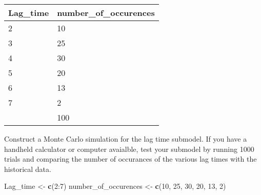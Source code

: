 \documentclass[]{article}
\newenvironment{Shaded}{\begin{snugshade}}{\end{snugshade}}
\newcommand{\KeywordTok}[1]{\textcolor[rgb]{0.13,0.29,0.53}{\textbf{{#1}}}}
\newcommand{\DecValTok}[1]{\textcolor[rgb]{0.00,0.00,0.81}{{#1}}}
\newcommand{\StringTok}[1]{\textcolor[rgb]{0.31,0.60,0.02}{{#1}}}
\newcommand{\NormalTok}[1]{{#1}}
\begin{document}
\begin{longtable}[]{@{}ll@{}}
\toprule
Lag\_time & number\_of\_occurences\tabularnewline
\midrule
\endhead
2 & 10\tabularnewline
3 & 25\tabularnewline
4 & 30\tabularnewline
5 & 20\tabularnewline
6 & 13\tabularnewline
7 & 2\tabularnewline
& 100\tabularnewline
\bottomrule
\end{longtable}

Construct a Monte Carlo simulation for the lag time submodel. If you
have a handheld calculator or computer avaialble, test your submodel by
running 1000 trials and comparing the number of occurances of the
various lag times with the historical data.

\begin{Shaded}
\begin{Highlighting}[]
\NormalTok{Lag_time <-}\StringTok{ }\KeywordTok{c}\NormalTok{(}\DecValTok{2}\NormalTok{:}\DecValTok{7}\NormalTok{)}
\NormalTok{number_of_occurences <-}\StringTok{ }\KeywordTok{c}\NormalTok{(}\DecValTok{10}\NormalTok{, }\DecValTok{25}\NormalTok{, }\DecValTok{30}\NormalTok{, }\DecValTok{20}\NormalTok{, }\DecValTok{13}\NormalTok{, }\DecValTok{2}\NormalTok{)}


\end{Highlighting}
\end{Shaded}
\end{document}
